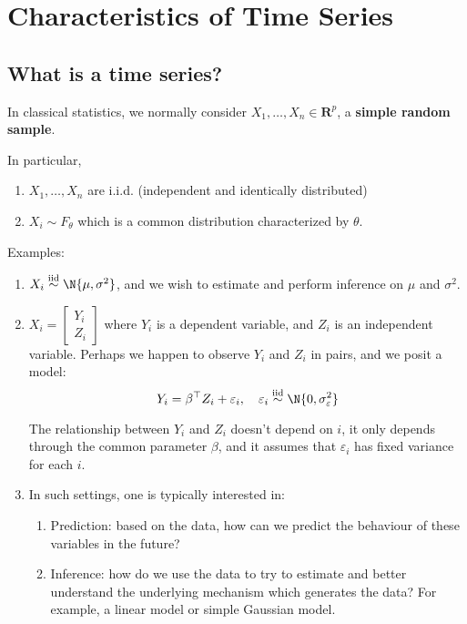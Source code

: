 \chapter{Characteristics of Time Series}
\section{What is a time series?}
In classical statistics, we normally consider $ X_1,\ldots,X_n\in\mathbf{R}^p $,
a \textbf{simple random sample}.

In particular,
\begin{enumerate}[(1)]
    \item $ X_1,\ldots,X_n $ are i.i.d. (independent and identically distributed)
    \item $ X_i \sim F_\theta $ which is a common distribution characterized
          by $ \theta $.
\end{enumerate}
Examples:
\begin{enumerate}
    \item $ X_i \stackrel{\text{iid}}{\sim} \N{\mu,\sigma^2} $, and we wish to estimate
          and perform inference on $ \mu $ and $ \sigma^2 $.
    \item $ X_i=\begin{bmatrix}
                  Y_i \\
                  Z_i
              \end{bmatrix} $ where $ Y_i $ is a dependent variable, and
          $ Z_i $ is an independent variable.
              {\color{blue}Perhaps we happen to observe
                  $ Y_i $ and $ Z_i $ in pairs, and we posit a model:}
          \[ Y_i=\beta^\top Z_i+\varepsilon_i,\quad\varepsilon_i
              \stackrel{\text{iid}}{\sim} \N{0,\sigma_{\varepsilon}^2} \]
          \begin{Remark}{}{}
              The relationship between $ Y_i $ and $ Z_i $ doesn't
              depend on $ i $, it only depends through the common parameter
              $ \beta $, and it assumes that $ \varepsilon_i $ has fixed variance
              for each $ i $.
          \end{Remark}
    \item In such settings, one is typically interested in:
          \begin{enumerate}
              \item Prediction: {\color{blue} based on the data, how can we predict
                    the behaviour of these variables in the future?}
              \item Inference: {\color{blue}how do we use the data to try to estimate
                    and better understand the underlying mechanism which generates
                    the data? For example, a linear model or simple Gaussian model.}
          \end{enumerate}
\end{enumerate}
